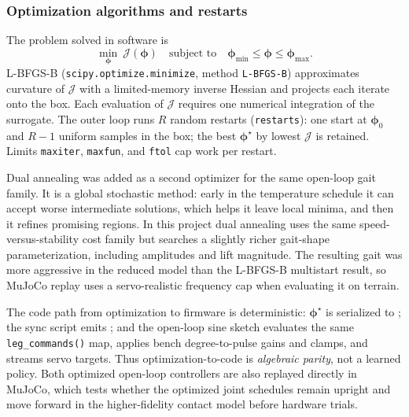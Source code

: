 \documentclass[11pt]{article}
\begin{document}
\subsubsection{Optimization algorithms and restarts}
The problem solved in software is
\begin{equation}
  \min_{\boldsymbol{\phi}}\ \mathcal{J}(\boldsymbol{\phi})
  \quad\text{subject to}\quad
  \boldsymbol{\phi}_{\min}\le \boldsymbol{\phi}\le \boldsymbol{\phi}_{\max}.
\end{equation}
L-BFGS-B (\texttt{scipy.optimize.minimize}, method \texttt{L-BFGS-B}) approximates curvature of $\mathcal{J}$ with a limited-memory inverse Hessian and projects each iterate onto the box. Each evaluation of $\mathcal{J}$ requires one numerical integration of the surrogate. The outer loop runs $R$ random restarts (\texttt{restarts}): one start at $\boldsymbol{\phi}_{0}$ and $R-1$ uniform samples in the box; the best $\boldsymbol{\phi}^\star$ by lowest $\mathcal{J}$ is retained. Limits \texttt{maxiter}, \texttt{maxfun}, and \texttt{ftol} cap work per restart.

Dual annealing was added as a second optimizer for the same open-loop gait family. It is a global stochastic method: early in the temperature schedule it can accept worse intermediate solutions, which helps it leave local minima, and then it refines promising regions. In this project dual annealing uses the same speed-versus-stability cost family but searches a slightly richer gait-shape parameterization, including amplitudes and lift magnitude. The resulting gait was more aggressive in the reduced model than the L-BFGS-B multistart result, so MuJoCo replay uses a servo-realistic frequency cap when evaluating it on terrain.

The code path from optimization to firmware is deterministic: $\boldsymbol{\phi}^\star$ is serialized to ; the sync script emits ; and the open-loop sine sketch evaluates the same \texttt{leg\_commands()} map, applies bench degree-to-pulse gains and clamps, and streams servo targets. Thus optimization-to-code is \emph{algebraic parity}, not a learned policy. Both optimized open-loop controllers are also replayed directly in MuJoCo, which tests whether the optimized joint schedules remain upright and move forward in the higher-fidelity contact model before hardware trials.
\end{document}
